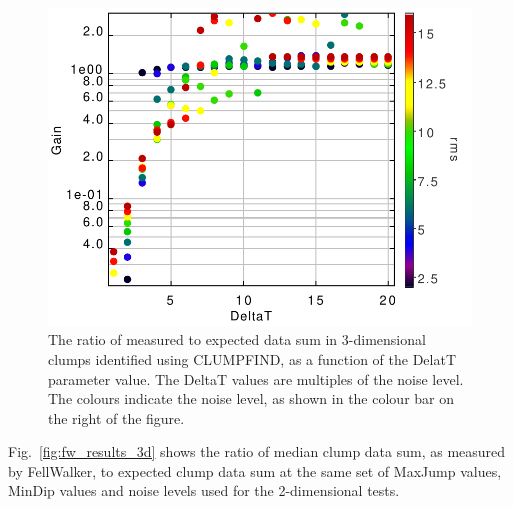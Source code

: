 \documentclass[final,authoryear,5p,times,twocolumn]{elsarticle}
\begin{document}
\begin{figure}
\includegraphics[width=\columnwidth]{comp4_cf_3d}
\caption{The ratio of measured to expected data sum in 3-dimensional clumps
identified using CLUMPFIND, as a function of the DelatT parameter value.
The DeltaT values are multiples of the noise level. The colours indicate
the noise level, as shown in the colour
bar on the right of the figure.}
\label{fig:cf_results_3d}
\end{figure}

Fig.~\ref{fig:fw_results_3d} shows the ratio of median clump data sum, as
measured by FellWalker, to expected clump data sum at the same set of
MaxJump values, MinDip values and noise levels used for the 2-dimensional
tests.
\end{document}

